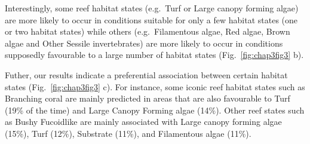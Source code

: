 \begin{refsection}
Interestingly, some reef habitat states (e.g.~Turf or Large canopy
forming algae) are more likely to occur in conditions suitable for only
a few habitat states (one or two habitat states) while others
(e.g.~Filamentous algae, Red algae, Brown algae and Other Sessile
invertebrates) are more likely to occur in conditions supposedly
favourable to a large number of habitat states (Fig.~\ref{fig:chap3fig3}
b).

Futher, our results indicate a preferential association between certain
habitat states (Fig.~\ref{fig:chap3fig3} c). For instance, some iconic
reef habitat states such as Branching coral are mainly predicted in
areas that are also favourable to Turf (19\% of the time) and Large
Canopy Forming algae (14\%). Other reef states such as Bushy Fucoidlike
are mainly associated with Large canopy forming algae (15\%), Turf
(12\%), Substrate (11\%), and Filamentous algae (11\%).


\end{refsection}
